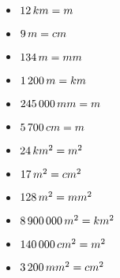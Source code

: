\begin{multicols}{2} 

\begin{itemize}[label={$\bullet$}]
  \item $12 \,km = \dotfill m$
  \item $9 \,m = \dotfill cm$
  \item $134 \,m = \dotfill mm$
  \item $1\, 200 \,m = \dotfill km$
  \item $245\, 000 \,mm = \dotfill m$
  \item $5\, 700 \,cm = \dotfill m$
\end{itemize} 

\begin{itemize}[label={$\bullet$}]
  \item $24 \,km^2 = \dotfill m^2$
  \item $17 \,m^2 = \dotfill cm^2$
  \item $128 \,m^2 = \dotfill mm^2$
  \item $8\, 900 \, 000 \,m^2 = \dotfill km^2$
  \item $140\, 000 \,cm^2 = \dotfill m^2$
  \item $3\, 200 \,mm^2 = \dotfill cm^2$
\end{itemize} 

\end{multicols}

